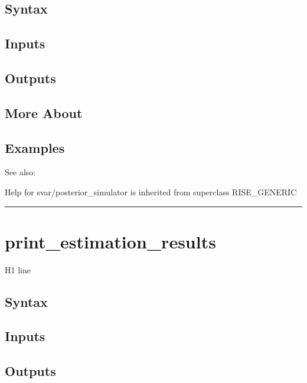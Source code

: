 \documentclass[letterpaper,10pt,english]{sphinxmanual}
\begin{document}
\subsection{Syntax}
\label{classes/models/@svar/svar:id80}

\subsection{Inputs}
\label{classes/models/@svar/svar:id81}

\subsection{Outputs}
\label{classes/models/@svar/svar:id82}

\subsection{More About}
\label{classes/models/@svar/svar:id83}

\subsection{Examples}
\label{classes/models/@svar/svar:id84}
See also:

Help for svar/posterior\_simulator is inherited from superclass RISE\_GENERIC


\bigskip\hrule{}\bigskip



\section{print\_estimation\_results}
\label{classes/models/@svar/svar:print-estimation-results}\label{classes/models/@svar/svar:id85}
H1 line


\subsection{Syntax}
\label{classes/models/@svar/svar:id86}

\subsection{Inputs}
\label{classes/models/@svar/svar:id87}

\subsection{Outputs}
\label{classes/models/@svar/svar:id88}
\end{document}
